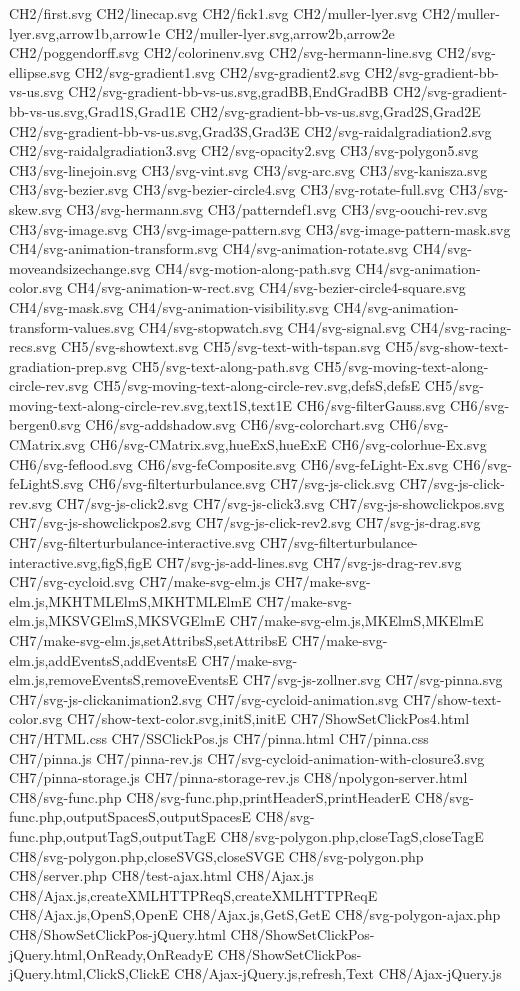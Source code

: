 CH2/first.svg
CH2/linecap.svg
CH2/fick1.svg
CH2/muller-lyer.svg
CH2/muller-lyer.svg,arrow1b,arrow1e
CH2/muller-lyer.svg,arrow2b,arrow2e
CH2/poggendorff.svg
CH2/colorinenv.svg
CH2/svg-hermann-line.svg
CH2/svg-ellipse.svg
CH2/svg-gradient1.svg
CH2/svg-gradient2.svg
CH2/svg-gradient-bb-vs-us.svg
CH2/svg-gradient-bb-vs-us.svg,gradBB,EndGradBB
CH2/svg-gradient-bb-vs-us.svg,Grad1S,Grad1E
CH2/svg-gradient-bb-vs-us.svg,Grad2S,Grad2E
CH2/svg-gradient-bb-vs-us.svg,Grad3S,Grad3E
CH2/svg-raidalgradiation2.svg
CH2/svg-raidalgradiation3.svg
CH2/svg-opacity2.svg
CH3/svg-polygon5.svg
CH3/svg-linejoin.svg
CH3/svg-vint.svg
CH3/svg-arc.svg
CH3/svg-kanisza.svg
CH3/svg-bezier.svg
CH3/svg-bezier-circle4.svg
CH3/svg-rotate-full.svg
CH3/svg-skew.svg
CH3/svg-hermann.svg
CH3/patterndef1.svg
CH3/svg-oouchi-rev.svg
CH3/svg-image.svg
CH3/svg-image-pattern.svg
CH3/svg-image-pattern-mask.svg
CH4/svg-animation-transform.svg
CH4/svg-animation-rotate.svg
CH4/svg-moveandsizechange.svg
CH4/svg-motion-along-path.svg
CH4/svg-animation-color.svg
CH4/svg-animation-w-rect.svg
CH4/svg-bezier-circle4-square.svg
CH4/svg-mask.svg
CH4/svg-animation-visibility.svg
CH4/svg-animation-transform-values.svg
CH4/svg-stopwatch.svg
CH4/svg-signal.svg
CH4/svg-racing-recs.svg
CH5/svg-showtext.svg
CH5/svg-text-with-tspan.svg
CH5/svg-show-text-gradiation-prep.svg
CH5/svg-text-along-path.svg
CH5/svg-moving-text-along-circle-rev.svg
CH5/svg-moving-text-along-circle-rev.svg,defsS,defsE
CH5/svg-moving-text-along-circle-rev.svg,text1S,text1E
CH6/svg-filterGauss.svg
CH6/svg-bergen0.svg
CH6/svg-addshadow.svg
CH6/svg-colorchart.svg
CH6/svg-CMatrix.svg
CH6/svg-CMatrix.svg,hueExS,hueExE
CH6/svg-colorhue-Ex.svg
CH6/svg-feflood.svg
CH6/svg-feComposite.svg
CH6/svg-feLight-Ex.svg
CH6/svg-feLightS.svg
CH6/svg-filterturbulance.svg
CH7/svg-js-click.svg
CH7/svg-js-click-rev.svg
CH7/svg-js-click2.svg
CH7/svg-js-click3.svg
CH7/svg-js-showclickpos.svg
CH7/svg-js-showclickpos2.svg
CH7/svg-js-click-rev2.svg
CH7/svg-js-drag.svg
CH7/svg-filterturbulance-interactive.svg
CH7/svg-filterturbulance-interactive.svg,figS,figE
CH7/svg-js-add-lines.svg
CH7/svg-js-drag-rev.svg
CH7/svg-cycloid.svg
CH7/make-svg-elm.js
CH7/make-svg-elm.js,MKHTMLElmS,MKHTMLElmE
CH7/make-svg-elm.js,MKSVGElmS,MKSVGElmE
CH7/make-svg-elm.js,MKElmS,MKElmE
CH7/make-svg-elm.js,setAttribsS,setAttribsE
CH7/make-svg-elm.js,addEventsS,addEventsE
CH7/make-svg-elm.js,removeEventsS,removeEventsE
CH7/svg-js-zollner.svg
CH7/svg-pinna.svg
CH7/svg-js-clickanimation2.svg
CH7/svg-cycloid-animation.svg
CH7/show-text-color.svg
CH7/show-text-color.svg,initS,initE
CH7/ShowSetClickPos4.html
CH7/HTML.css
CH7/SSClickPos.js
CH7/pinna.html
CH7/pinna.css
CH7/pinna.js
CH7/pinna-rev.js
CH7/svg-cycloid-animation-with-closure3.svg
CH7/pinna-storage.js
CH7/pinna-storage-rev.js
CH8/npolygon-server.html
CH8/svg-func.php
CH8/svg-func.php,printHeaderS,printHeaderE
CH8/svg-func.php,outputSpacesS,outputSpacesE
CH8/svg-func.php,outputTagS,outputTagE
CH8/svg-polygon.php,closeTagS,closeTagE
CH8/svg-polygon.php,closeSVGS,closeSVGE
CH8/svg-polygon.php
CH8/server.php
CH8/test-ajax.html
CH8/Ajax.js
CH8/Ajax.js,createXMLHTTPReqS,createXMLHTTPReqE
CH8/Ajax.js,OpenS,OpenE
CH8/Ajax.js,GetS,GetE
CH8/svg-polygon-ajax.php
CH8/ShowSetClickPos-jQuery.html
CH8/ShowSetClickPos-jQuery.html,OnReady,OnReadyE
CH8/ShowSetClickPos-jQuery.html,ClickS,ClickE
CH8/Ajax-jQuery.js,refresh,Text
CH8/Ajax-jQuery.js
